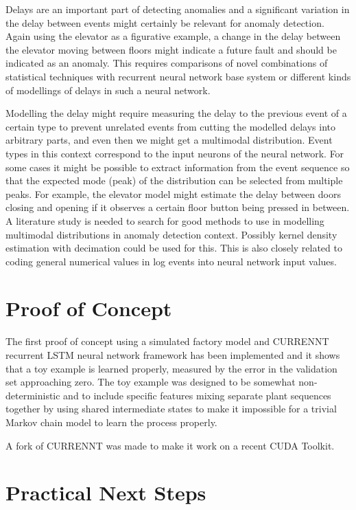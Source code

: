 \documentclass[a4paper,10pt]{article}
\begin{document}
Delays are an important part of detecting anomalies and a significant variation in the delay between events might certainly be relevant for anomaly detection.
Again using the elevator as a figurative example, a change in the delay between the elevator moving between floors might indicate a future fault and should be indicated
as an anomaly. This requires comparisons of novel combinations of statistical techniques with recurrent neural network base system or different kinds of
modellings of delays in such a neural network.

Modelling the delay might require measuring the delay to the previous event of a certain type to prevent unrelated events from cutting the modelled delays into arbitrary parts,
and even then we might get a multimodal distribution. Event types in this context correspond to the input neurons of the neural network.
For some cases it might be possible to extract information from the event sequence so that
the expected mode (peak) of the distribution can be selected from multiple peaks. For example,
the elevator model might estimate the delay between doors closing and opening if it observes a certain floor button being pressed in between.
A literature study is needed to search for good methods to use in modelling multimodal distributions in anomaly detection context. Possibly kernel density estimation
with decimation could be used for this. This is also closely related to coding general numerical values in log events into neural network input values.

\section{Proof of Concept}

The first proof of concept using a simulated factory model and CURRENNT\cite{CURRENNT} recurrent LSTM neural network framework
has been implemented and it shows that a toy example\cite{PoC}
is learned properly, measured by the error in the validation set approaching zero. The toy example was designed to be somewhat non-deterministic and to include specific
features mixing separate plant sequences together by using shared intermediate states to make it impossible for a trivial Markov chain model to learn the process properly.

A fork of CURRENNT was made to make it work on a recent CUDA Toolkit\cite{CURRENNTFORK}.

\section{Practical Next Steps}
\end{document}
